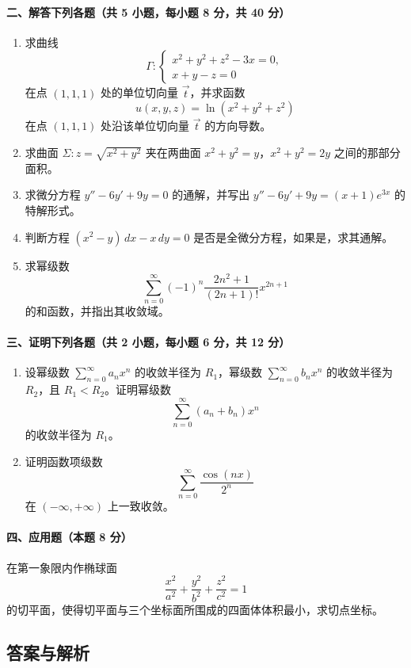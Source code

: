 \paragraph*{二、解答下列各题（共 5 小题，每小题 8 分，共 40 分）}
\begin{enumerate}
  \item 求曲线
  \[
    \Gamma:
    \begin{cases}
      x^2+y^2+z^2-3x=0,\\
      x+y-z=0
    \end{cases}
  \]
  在点 $(1,1,1)$ 处的单位切向量 $\vec t$，并求函数
  \[
    u(x,y,z)=\ln(x^2+y^2+z^2)
  \]
  在点 $(1,1,1)$ 处沿该单位切向量 $\vec t$ 的方向导数。
  \item 求曲面 $\Sigma:z=\sqrt{x^2+y^2}$ 夹在两曲面 $x^2+y^2=y$，$x^2+y^2=2y$ 之间的那部分面积。
  \item 求微分方程 $y''-6y'+9y=0$ 的通解，并写出 $y''-6y'+9y=(x+1)e^{3x}$ 的特解形式。
  \item 判断方程 $(x^2-y)\,dx-x\,dy=0$ 是否是全微分方程，如果是，求其通解。
  \item 求幂级数
  \[
    \sum_{n=0}^{\infty}(-1)^n\frac{2n^2+1}{(2n+1)!}x^{2n+1}
  \]
  的和函数，并指出其收敛域。
\end{enumerate}

\paragraph*{三、证明下列各题（共 2 小题，每小题 6 分，共 12 分）}
\begin{enumerate}
  \item 设幂级数 $\sum_{n=0}^\infty a_nx^n$ 的收敛半径为 $R_1$，幂级数 $\sum_{n=0}^\infty b_nx^n$ 的收敛半径为 $R_2$，且 $R_1<R_2$。证明幂级数
  \[
    \sum_{n=0}^\infty (a_n+b_n)x^n
  \]
  的收敛半径为 $R_1$。
  \item 证明函数项级数
  \[
    \sum_{n=0}^\infty \frac{\cos(nx)}{2^n}
  \]
  在 $(-\infty,+\infty)$ 上一致收敛。
\end{enumerate}

\paragraph*{四、应用题（本题 8 分）}
在第一象限内作椭球面
\[
  \frac{x^2}{a^2}+\frac{y^2}{b^2}+\frac{z^2}{c^2}=1
\]
的切平面，使得切平面与三个坐标面所围成的四面体体积最小，求切点坐标。

\subsection{答案与解析}

